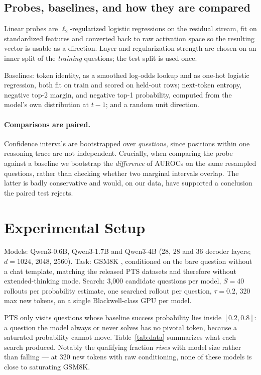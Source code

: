 \documentclass{article}
\begin{document}
\subsection{Probes, baselines, and how they are compared}
\label{sec:probes}

Linear probes are $\ell_2$-regularized logistic regressions on the residual
stream, fit on standardized features and converted back to raw activation
space so the resulting vector is usable as a direction. Layer and
regularization strength are chosen on an inner split of the \emph{training}
questions; the test split is used once.

Baselines: token identity, as a smoothed log-odds lookup and as one-hot
logistic regression, both fit on train and scored on held-out rows;
next-token entropy, negative top-2 margin, and negative top-1 probability,
computed from the model's own distribution at $t-1$; and a random unit
direction.

\paragraph{Comparisons are paired.} Confidence intervals are bootstrapped
over \emph{questions}, since positions within one reasoning trace are not
independent. Crucially, when comparing the probe against a baseline we
bootstrap the \emph{difference} of AUROCs on the same resampled questions,
rather than checking whether two marginal intervals overlap. The latter is
badly conservative and would, on our data, have supported a conclusion the
paired test rejects.

\section{Experimental Setup}
\label{sec:setup}

Models: Qwen3-0.6B, Qwen3-1.7B and Qwen3-4B \citep{qwen3technicalreport}
(28, 28 and 36 decoder layers; $d = 1024$, 2048, 2560). Task: GSM8K
\citep{cobbe2021gsm8k}, conditioned on the bare question without a chat
template, matching the released PTS datasets and therefore without
extended-thinking mode. Search: 3{,}000 candidate questions per model,
$S{=}40$ rollouts per probability estimate, one searched rollout per
question, $\tau{=}0.2$, 320 max new tokens, on a single Blackwell-class
GPU per model.

PTS only visits questions whose baseline success probability lies inside
$[0.2, 0.8]$: a question the model always or never solves has no pivotal
token, because a saturated probability cannot move. Table~\ref{tab:data}
summarizes what each search produced. Notably the qualifying fraction
\emph{rises} with model size rather than falling --- at 320 new tokens with
raw conditioning, none of these models is close to saturating GSM8K.
\end{document}
